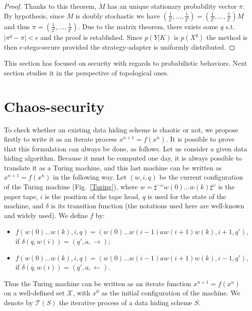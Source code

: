 \documentclass{comjnl}
\begin{document}
\begin{proof}
Thanks to this theorem, $M$ 
has an unique stationary  probability vector $\pi$. 
By hypothesis, since $M$ is doubly stochastic we have 
$(\frac{1}{2^l},\dots,\frac{1}{2^l}) = (\frac{1}{2^l},\dots,\frac{1}{2^l})M$
and thus $\pi =  (\frac{1}{2^l},\dots,\frac{1}{2^l})$.
Due to the matrix theorem, there exists some 
$q$ s.t. 
$|\pi^q- \pi| < \epsilon$
and the proof is established.
Since $p(Y| K)$ is $p(X^q)$ the method is then $\epsilon$-stego-secure
provided the strategy-adapter is uniformly distributed.
 \end{proof}

This section has focused on security with regards to probabilistic behaviors. 
Next section studies it in the perspective of topological ones.




\section{Chaos-security}\label{sec:chaossecurity}


 To check whether an existing data hiding scheme is chaotic or not, we propose firstly to write it as an iterate process $x^{n+1}=f(x^n)$. It is possible to prove that this formulation can always be done, as follows. Let us consider a given data hiding algorithm. Because it must be computed one day, it is always possible to translate it as a Turing machine, and this last machine can be written as $x^{n+1} = f(x^n)$ in the following way. Let $(w,i,q)$ be the current configuration of the Turing machine (Fig.~\ref{Turing}), where $w=\sharp^{-\omega} w(0) \hdots w(k)\sharp^{\omega}$ is the paper tape, $i$ is the position of the tape head, $q$ is used for the state of the machine, and $\delta$ is its transition function (the notations used here are well-known and widely used). We define $f$ by:
 \begin{itemize}
 \item $f(w(0) \hdots w(k),i,q) = ( w(0) \hdots w(i-1)aw(i+1)w(k),i+1,q')$, if  $\delta(q,w(i)) = (q',a,\rightarrow)$;
 \item $f( w(0) \hdots w(k),i,q) = (w(0) \hdots w(i-1)aw(i+1)w(k),i-1,q')$,  if $\delta(q,w(i)) = (q',a,\leftarrow)$.
 \end{itemize}
 Thus the Turing machine can be written as an iterate function $x^{n+1}=f(x^n)$ on a well-defined set $\mathcal{X}$, with $x^0$ as the initial configuration of the machine. We denote by $\mathcal{T}(S)$ the iterative process of a data hiding scheme $S$.
\end{document}
